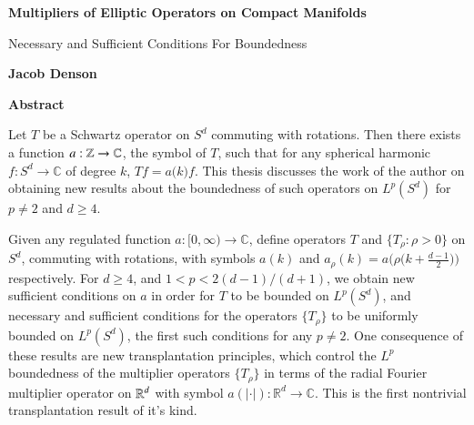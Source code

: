 
\fancyhf{} %
\fancyhead[RO,R]{\thepage} %
\renewcommand{\headrulewidth}{0pt}

\begin{center}
    \Large
    \textbf{Multipliers of Elliptic Operators on Compact Manifolds}
    
    \vspace{0.4cm}
    \large
    Necessary and Sufficient Conditions For Boundedness
    
    \vspace{0.4cm}
    \textbf{Jacob Denson}
    
    \vspace{0.9cm}
    \textbf{Abstract}
\end{center}

Let $T$ be a Schwartz operator on $S^d$ commuting with rotations. Then there exists a function $a: \operatorname{\mathbb{Z}} \to \operatorname{\mathbb{C}}$, the symbol of $T$, such that for any spherical harmonic $f: S^d \to \mathbb{C}$ of degree $k$, $Tf = a \big( k \big) f$. This thesis discusses the work of the author on obtaining new results about the boundedness of such operators on $L^p(S^d)$ for $p \neq 2$ and $d \geq 4$.

Given any regulated function $a: [0,\infty) \to \mathbb{C}$, define operators $T$ and $\{ T_\rho : \rho > 0 \}$ on $S^d$, commuting with rotations, with symbols $a(k)$ and $a_\rho(k) = a \big( \rho \big( k + \tfrac{d-1}{2} \big) \big)$ respectively. For $d \geq 4$, and $1 < p < 2(d-1)/(d+1)$, we obtain new sufficient conditions on $a$ in order for $T$ to be bounded on $L^p(S^d)$, and necessary and sufficient conditions for the operators $\{ T_\rho \}$ to be uniformly bounded on $L^p(S^d)$, the first such conditions for any $p \neq 2$. One consequence of these results are new transplantation principles, which control the $L^p$ boundedness of the multiplier operators $\{ T_\rho \}$ in terms of the radial Fourier multiplier operator on $\operatorname{\mathbb{R}}^d$ with symbol $a(|\cdot|): \mathbb{R}^d \to \mathbb{C}$. This is the first nontrivial transplantation result of it's kind.


%


